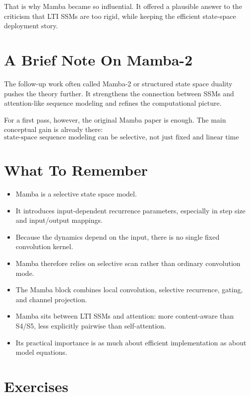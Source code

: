 That is why Mamba became so influential. It offered a plausible answer to the criticism
that LTI SSMs are too rigid, while keeping the efficient state-space deployment story.

\section{A Brief Note On Mamba-2}

The follow-up work often called Mamba-2 or structured state space duality
\citep{dao2024mamba2} pushes the theory further. It strengthens the connection between
SSMs and attention-like sequence modeling and refines the computational picture.

For a first pass, however, the original Mamba paper is enough. The main conceptual gain is
already there:
\[
  \text{state-space sequence modeling can be selective, not just fixed and linear time invariant.}
\]

\section{What To Remember}

\begin{itemize}
  \item Mamba is a selective state space model.
  \item It introduces input-dependent recurrence parameters, especially in step size and
  input/output mappings.
  \item Because the dynamics depend on the input, there is no single fixed convolution
  kernel.
  \item Mamba therefore relies on selective scan rather than ordinary convolution mode.
  \item The Mamba block combines local convolution, selective recurrence, gating, and
  channel projection.
  \item Mamba sits between LTI SSMs and attention: more content-aware than S4/S5, less
  explicitly pairwise than self-attention.
  \item Its practical importance is as much about efficient implementation as about model
  equations.
\end{itemize}

\section{Exercises}

